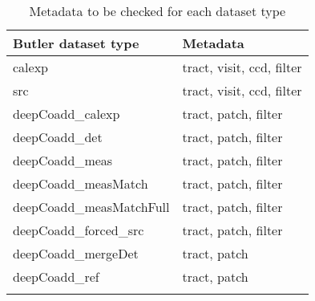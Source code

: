\begin{longtable}{l|l} \label{tab:metadata}
Butler dataset type & Metadata \\
\hline
calexp & tract, visit, ccd, filter \\
src & tract, visit, ccd, filter \\
deepCoadd{\_}calexp  & tract, patch, filter \\
deepCoadd{\_}det & tract, patch, filter \\
deepCoadd{\_}meas & tract, patch, filter \\
deepCoadd{\_}measMatch & tract, patch, filter  \\
deepCoadd{\_}measMatchFull & tract, patch, filter \\
deepCoadd{\_}forced{\_}src & tract, patch, filter \\
deepCoadd{\_}mergeDet &  tract, patch \\
deepCoadd{\_}ref & tract, patch \\
\caption{Metadata to be checked for each dataset type}
\end{longtable}

